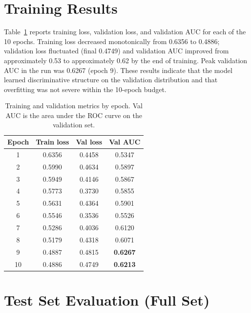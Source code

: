 \documentclass[11pt,a4paper]{article}
\begin{document}
\section{Training Results}

Table~\ref{tab:training} reports training loss, validation loss, and validation AUC for each of the 10 epochs. Training loss decreased monotonically from 0.6356 to 0.4886; validation loss fluctuated (final 0.4749) and validation AUC improved from approximately 0.53 to approximately 0.62 by the end of training. Peak validation AUC in the run was 0.6267 (epoch 9). These results indicate that the model learned discriminative structure on the validation distribution and that overfitting was not severe within the 10-epoch budget.

\begin{table}[ht]
\centering
\caption{Training and validation metrics by epoch. Val AUC is the area under the ROC curve on the validation set.}
\label{tab:training}
\begin{tabular}{@{}cccc@{}}
\toprule
Epoch & Train loss & Val loss & Val AUC \\
\midrule
1  & 0.6356 & 0.4458 & 0.5347 \\
2  & 0.5990 & 0.4634 & 0.5897 \\
3  & 0.5949 & 0.4146 & 0.5867 \\
4  & 0.5773 & 0.3730 & 0.5855 \\
5  & 0.5631 & 0.4364 & 0.5901 \\
6  & 0.5546 & 0.3536 & 0.5526 \\
7  & 0.5286 & 0.4036 & 0.6120 \\
8  & 0.5179 & 0.4318 & 0.6071 \\
9  & 0.4887 & 0.4815 & \textbf{0.6267} \\
10 & 0.4886 & 0.4749 & \textbf{0.6213} \\
\bottomrule
\end{tabular}
\end{table}

\section{Test Set Evaluation (Full Set)}
\end{document}
